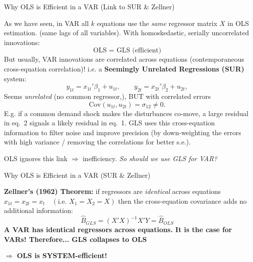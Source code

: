 \documentclass{beamer}
\begin{document}
\begin{frame}{Why OLS is Efficient in a VAR (Link to SUR \& Zellner)}
\small

As we have seen, in VAR all $k$ equations use the \emph{same} regressor matrix $X$ in OLS estimation. (same lags of all variables). With homoskedastic, serially uncorrelated innovations:
\[
\boxed{\text{OLS = GLS (efficient)}}
\]
But usually, VAR innovations are correlated across equations (contemporaneous cross-equation correlation)! i.e. a\textbf{ Seemingly Unrelated Regressions (SUR)} system:
\[
y_{1t}=x_{1t}'\beta_1+u_{1t}, \qquad
y_{2t}=x_{2t}'\beta_2+u_{2t},
\]
Seems \textit{unrelated} (no common regressor,), BUT with correlated errors  
\[
\mathrm{Cov}(u_{1t},u_{2t})=\sigma_{12}\neq 0.
\]
E.g. if a common demand shock makes the disturbances co-move, a large residual in eq.~2 signals a likely residual in eq.~1. GLS uses this cross-equation information to filter noise and improve precision (by down-weighting the errors with high variance / removing the correlations for better s.e.). 

\bigskip

OLS ignores this link $\Rightarrow$ inefficiency. \textit{So should we use GLS for VAR? }


\end{frame}


\begin{frame}{Why OLS is Efficient in a VAR (SUR \& Zellner)}

\textbf{Zellner’s (1962) Theorem: } if regressors are \emph{identical} across equations $x_{1t}=x_{2t}=x_t \quad (\text{i.e. } X_1=X_2=X)$ then the cross-equation covariance adds no additional information:
\[
\widehat{B}_{GLS}=(X'X)^{-1}X'Y=\widehat{B}_{OLS}
\]
\textbf{A VAR has identical regressors across equations. It is the case for VARs! Therefore...  GLS collapses to OLS
}
\bigskip

$\Longrightarrow$ \textbf{OLS is SYSTEM-efficient!}

\end{frame}
\end{document}
